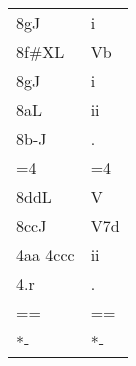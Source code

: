 \begin{tabular}{ll}
8gJ                           & i            \\
8f\#XL                        & Vb           \\
8gJ                           & i            \\
8aL                           & ii           \\
8b-J                          & .            \\
=4                            & =4           \\
8ddL                          & V            \\
8ccJ                          & V7d          \\
4aa 4ccc                      & ii           \\
4.r                           & .            \\
==                            & ==           \\
*-                            & *-          
\end{tabular}
